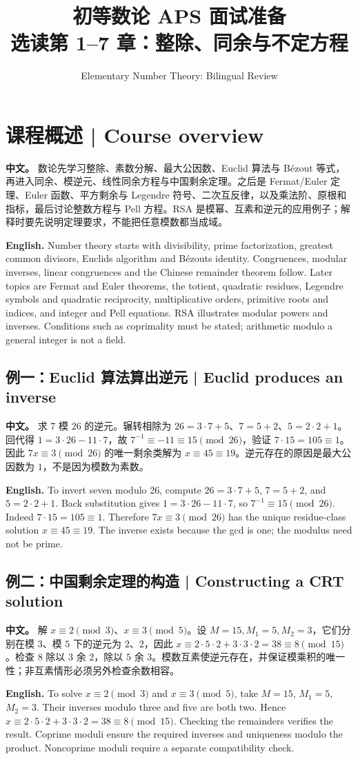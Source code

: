 \documentclass[UTF8,11pt,a4paper]{ctexart}
\title{初等数论 APS 面试准备\\[4pt]\large 选读第 1--7 章：整除、同余与不定方程}
\author{Elementary Number Theory: Bilingual Review}
\date{}
\newcommand{\APS}[2]{\par\noindent\textbf{中文。} #1\par\noindent\textbf{English.} #2\par\smallskip}
\begin{document}
\maketitle
\section*{课程概述 | Course overview}
\APS{数论先学习整除、素数分解、最大公因数、Euclid 算法与 Bézout 等式，再进入同余、模逆元、线性同余方程与中国剩余定理。之后是 Fermat/Euler 定理、Euler 函数、平方剩余与 Legendre 符号、二次互反律，以及乘法阶、原根和指标，最后讨论整数方程与 Pell 方程。RSA 是模幂、互素和逆元的应用例子；解释时要先说明定理要求，不能把任意模数都当成域。}{Number theory starts with divisibility, prime factorization, greatest common divisors, Euclid\textquotesingle s algorithm and Bézout\textquotesingle s identity. Congruences, modular inverses, linear congruences and the Chinese remainder theorem follow. Later topics are Fermat and Euler theorems, the totient, quadratic residues, Legendre symbols and quadratic reciprocity, multiplicative orders, primitive roots and indices, and integer and Pell equations. RSA illustrates modular powers and inverses. Conditions such as coprimality must be stated; arithmetic modulo a general integer is not a field.}
\subsection*{例一：Euclid 算法算出逆元 | Euclid produces an inverse}
\APS{求 $7$ 模 $26$ 的逆元。辗转相除为 $26=3\cdot7+5$、$7=5+2$、$5=2\cdot2+1$。回代得 $1=3\cdot26-11\cdot7$，故 $7^{-1}\equiv-11\equiv15\pmod{26}$，验证 $7\cdot15=105\equiv1$。因此 $7x\equiv3\pmod{26}$ 的唯一剩余类解为 $x\equiv45\equiv19$。逆元存在的原因是最大公因数为 $1$，不是因为模数为素数。}{To invert seven modulo 26, compute $26=3\cdot7+5$, $7=5+2$, and $5=2\cdot2+1$. Back substitution gives $1=3\cdot26-11\cdot7$, so $7^{-1}\equiv15\pmod{26}$. Indeed $7\cdot15=105\equiv1$. Therefore $7x\equiv3\pmod{26}$ has the unique residue-class solution $x\equiv45\equiv19$. The inverse exists because the gcd is one; the modulus need not be prime.}
\subsection*{例二：中国剩余定理的构造 | Constructing a CRT solution}
\APS{解 $x\equiv2\pmod3$、$x\equiv3\pmod5$。设 $M=15,M_1=5,M_2=3$，它们分别在模 $3$、模 $5$ 下的逆元为 $2$、$2$，因此 $x\equiv2\cdot5\cdot2+3\cdot3\cdot2=38\equiv8\pmod{15}$。检查 $8$ 除以 $3$ 余 $2$，除以 $5$ 余 $3$。模数互素使逆元存在，并保证模乘积的唯一性；非互素情形必须另外检查余数相容。}{To solve $x\equiv2\pmod3$ and $x\equiv3\pmod5$, take $M=15$, $M_1=5$, $M_2=3$. Their inverses modulo three and five are both two. Hence $x\equiv2\cdot5\cdot2+3\cdot3\cdot2=38\equiv8\pmod{15}$. Checking the remainders verifies the result. Coprime moduli ensure the required inverses and uniqueness modulo the product. Noncoprime moduli require a separate compatibility check.}
\end{document}

